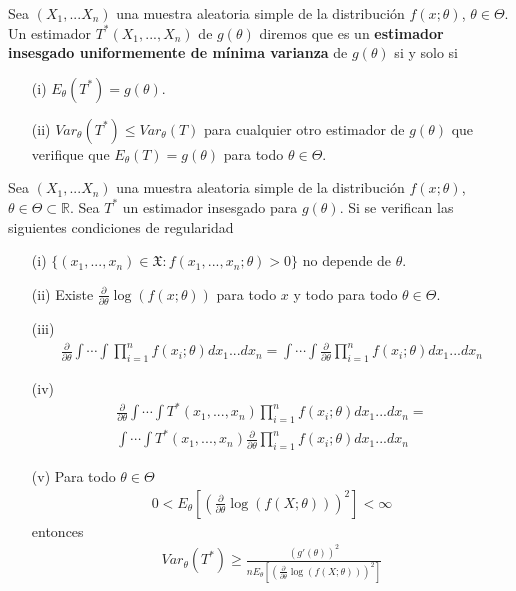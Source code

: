 \begin{defi}
Sea $(X_1,...X_n)$ una muestra aleatoria simple de la distribución $f(x;\theta)$, $\theta \in \Theta$. Un estimador $T^*(X_1,...,X_n)$ de $g(\theta)$ diremos que es un \textbf{estimador insesgado uniformemente de mínima varianza} de $g(\theta)$ si y solo si
\begin{enumerate}
    \item[(i)] $E_{\theta}(T^*) = g(\theta)$.
    \item[(ii)] $Var_{\theta}(T^*) \leq Var_{\theta}(T)$ para cualquier otro estimador de $g(\theta)$ que verifique que $E_{\theta}(T) = g(\theta)$ para todo $\theta \in \Theta$.
\end{enumerate}
\end{defi}

\begin{teo}
Sea $(X_1,...X_n)$ una muestra aleatoria simple de la distribución $f(x;\theta)$, $\theta \in \Theta \subset \mathbb{R}$. Sea $T^*$ un estimador insesgado para $g(\theta)$. Si se verifican las siguientes condiciones de regularidad
\begin{enumerate}
    \item[(i)] $\{ (x_1,...,x_n) \in \mathfrak{X} : f(x_1,...,x_n;\theta) > 0 \}$ no depende de $\theta$.
    \item[(ii)] Existe $\frac{\partial}{\partial \theta} \log(f(x;\theta))$ para todo $x$ y todo para todo $\theta \in \Theta$.
    \item[(iii)]
    \begin{align*}
        \frac{\partial}{\partial \theta} \int \cdots \int \prod_{i=1}^{n}{f(x_i;\theta)} dx_1 ... dx_n = \int \cdots \int \frac{\partial}{\partial \theta}  \prod_{i=1}^{n}{f(x_i;\theta)} dx_1 ... dx_n
    \end{align*}
    \item[(iv)]
    \begin{align*}
        \frac{\partial}{\partial \theta} \int \cdots \int T^*(x_1,...,x_n)\prod_{i=1}^{n}{f(x_i;\theta)} dx_1 ... dx_n = \\
        \int \cdots \int T^*(x_1,...,x_n)\frac{\partial}{\partial \theta} \prod_{i=1}^{n}{f(x_i;\theta)} dx_1 ... dx_n
    \end{align*}
    \item[(v)] Para todo $\theta \in \Theta$
    \begin{align*}
        0 < E_{\theta}\left[ \left( \frac{\partial}{\partial \theta}\log(f(X;\theta)) \right)^2\right] < \infty
    \end{align*}
    entonces
    \begin{align*}
        Var_{\theta}(T^*) \ge \frac{(g'(\theta))^2}{nE_{\theta}\left[ \left( \frac{\partial}{\partial \theta}\log(f(X;\theta)) \right)^2\right]}
    \end{align*}
\end{enumerate}
\end{teo}

